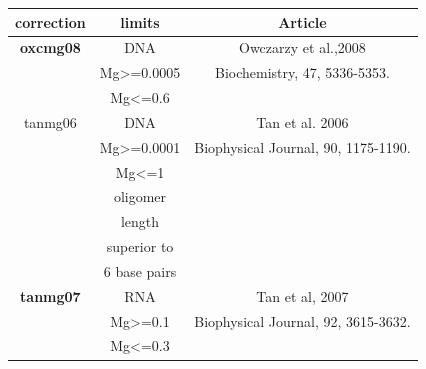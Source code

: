 \documentclass{article}
\begin{document}
 \begin{table}[hc]
\begin{tabular}[h]{| c | c | c |}
\textbf{correction} & \textbf{limits} & \textbf{Article} \\ 
\hline
\textbf{oxcmg08} & DNA & Owczarzy et al.,2008 \\
 & Mg>=0.0005 & Biochemistry, 47, 5336-5353. \\
 & Mg<=0.6 & \\
 \hline
tanmg06 & DNA & Tan et al. 2006 \\
 & Mg>=0.0001 & Biophysical Journal, 90, 1175-1190. \\
 & Mg<=1 & \\
 & oligomer & \\
 & length & \\
 & superior to & \\
 & 6 base pairs & \\
 \hline
\textbf{tanmg07} & RNA & Tan et al, 2007 \\
 & Mg>=0.1 & Biophysical Journal, 92, 3615-3632. \\
 & Mg<=0.3 & \\
 \hline
\end{tabular}
\end{table}

\pagebreak
\end{document}
